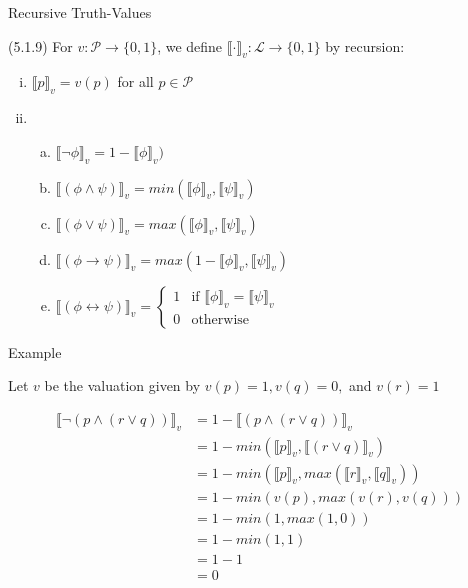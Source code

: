 \begin{frame}{Recursive Truth-Values}

(5.1.9) For $v:\mathcal{P}\to\{0,1\}$, we define $\llbracket\cdot\rrbracket_v:\mathcal{L}\to\{0,1\}$ by recursion:

\begin{enumerate}[(i)]
		
			\item  $\llbracket p\rrbracket_v=v(p)$ for all $p\in\mathcal{P}$
			
			\item \begin{enumerate}[(a)]
			
				\item  $\llbracket\neg \phi\rrbracket_v=1-\llbracket\phi\rrbracket_v)$
				
				\item  $\llbracket(\phi\land \psi)\rrbracket_v=min(\llbracket\phi\rrbracket_v, \llbracket\psi\rrbracket_v)$
				\item[] $\llbracket(\phi\lor \psi)\rrbracket_v=max(\llbracket\phi\rrbracket_v, \llbracket\psi\rrbracket_v)$		
				\item[] $\llbracket(\phi\to \psi)\rrbracket_v=max(1-\llbracket\phi\rrbracket_v, \llbracket\psi\rrbracket_v)$		
				
				\item[] $\llbracket(\phi\leftrightarrow \psi)\rrbracket_v=\begin{cases} 1 & \text{if } \llbracket\phi\rrbracket_v=\llbracket\psi\rrbracket_v\\0&\text{otherwise}\end{cases}$		
	
			\end{enumerate}			
		\end{enumerate}


\end{frame}

\begin{frame}{Example}

Let $v$ be the valuation given by $v(p)=1,v(q)=0,$ and $v(r)=1$

\begin{align*}
		\llbracket \neg (p\land (r\lor q))\rrbracket_v &=1-\llbracket (p\land (r\lor q))\rrbracket_v\tag{ii.a}\\
		&=1-min(\llbracket p\rrbracket_v, \llbracket (r\lor q)\rrbracket_v)\tag{ii.b}\\
		&=1-min(\llbracket p\rrbracket_v, max(\llbracket r\rrbracket_v,\llbracket q\rrbracket_v))\tag{ii.b}\\
		&=1-min(v(p), max(v(r), v(q)))\tag{i}\\
		&=1-min(1, max(1,0))\tag{given}\\
		&=1-min(1,1)\\
		&=1-1\\
		&=0
		\end{align*}

\end{frame}

